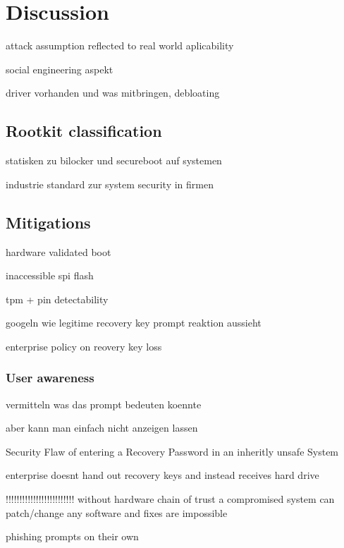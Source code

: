 
\chapter{Discussion}

attack assumption reflected to real world aplicability

social engineering aspekt

driver vorhanden und was mitbringen, debloating

\section{Rootkit classification}

statisken zu bilocker und secureboot auf systemen

industrie standard zur system security in firmen

\section{Mitigations}

hardware validated boot

inaccessible spi flash

tpm + pin detectability

googeln wie legitime recovery key prompt reaktion aussieht

enterprise policy on reovery key loss


\subsection{User awareness}

vermitteln was das prompt bedeuten koennte

aber kann man einfach nicht anzeigen lassen

Security Flaw of entering a Recovery Password in an inheritly unsafe System

enterprise doesnt hand out recovery keys and instead receives hard drive


!!!!!!!!!!!!!!!!!!!!!!!!!
without hardware chain of trust a compromised system can patch/change any software and fixes are impossible

phishing prompts on their own
